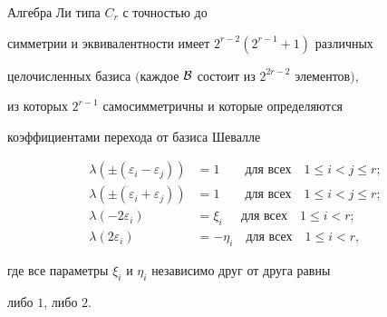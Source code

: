 \begin{athm}


Алгебра Ли типа $C_r$ с точностью до


симметрии и эквивалентности имеет $2^{r-2}(2^{r-1}+1)$ различных


целочисленных базиса $($каждое $\cal B$ состоит из $2^{2r-2}$ элементов$)$,


из которых $2^{r-1}$ самосимметричны и которые определяются


коэффициентами перехода от базиса Шевалле


\begin{equation}


\begin{split}


\lambda(\pm(\varepsilon_i-\varepsilon_j))&=1 \qquad \text{для всех}


\quad 1\le i<j\le r;\\


\lambda(\pm(\varepsilon_i+\varepsilon_j))&=1 \qquad \text{для всех}


\quad 1\le i<j\le r; \\


\lambda(-2\varepsilon_i)&=\xi_i \quad \ \ \text{для всех}\quad 1\le i<r;\\


\lambda(2\varepsilon_i)&=-\eta_i \quad \text{для всех}\quad 1\le i<r,


\end{split}


\tag{$\mathrm c$}


\end{equation}


где все параметры $\xi_i$ и $\eta_i$ независимо друг от друга равны


либо $1$, либо $2$.


\end{athm}


\addtocounter{athm}{2}





